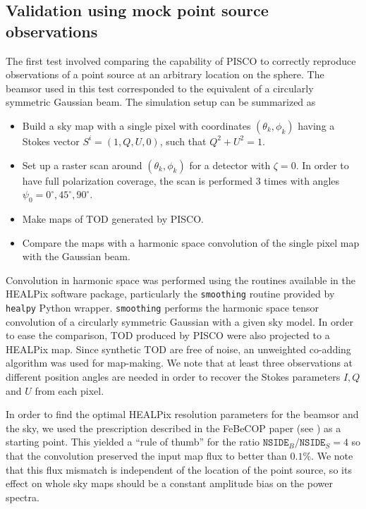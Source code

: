 \documentclass[a4paper,11pt]{article}
\begin{document}
\subsection{Validation using mock point source observations}

The first test involved comparing the capability of PISCO to correctly reproduce observations of a point source at an arbitrary location on the sphere. The beamsor used in this test corresponded to the equivalent of a circularly symmetric Gaussian beam. The simulation setup can be summarized as

\begin{itemize}
	\item Build a sky map with a single pixel with coordinates $(\theta_k,\phi_k)$ having a Stokes vector $S^{i} = (1,Q,U,0)$, such that $Q^2 + U^2 = 1$.
	\item Set up a raster scan around $(\theta_k,\phi_k)$ for a detector with $\zeta=0$. In order to have full polarization coverage, the scan is performed 3 times with angles $\psi_0 = 0^{\circ},45^{\circ},90^{\circ}$.
	\item Make maps of TOD generated by PISCO.
	\item Compare the maps with a harmonic space convolution of the single pixel map with the Gaussian beam.
\end{itemize}

\noindent
Convolution in harmonic space was performed using the routines available in the HEALPix software package\cite{2005ApJ...622..759G}, particularly the \texttt{smoothing} routine provided by \texttt{healpy} Python wrapper. \texttt{smoothing} performs the harmonic space tensor convolution of a circularly symmetric Gaussian with a given sky model. In order to ease the comparison, TOD produced by PISCO were also projected to a HEALPix map. Since synthetic TOD are free of noise, an unweighted co-adding algorithm was used for map-making. We note that at least three observations at different position angles are needed in order to recover the Stokes parameters $I,Q$ and $U$ from each pixel.

In order to find the optimal HEALPix resolution parameters for the beamsor and the sky, we used the prescription described in the FeBeCOP paper (see \cite{2011ApJS..193....5M}) as a starting point. This yielded a ``rule of thumb'' for the ratio $\mathrm{\texttt{NSIDE}}_{B} / \mathrm{\texttt{NSIDE}}_{S} = 4$ so that the convolution preserved the input map flux to better than $0.1\%$. We note that this flux mismatch is independent of the location of the point source, so its effect on whole sky maps should be a constant amplitude bias on the power spectra.
\end{document}

